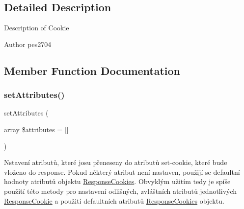 \subsection{Detailed Description}
Description of Cookie

\begin{DoxyAuthor}{Author}
pes2704 
\end{DoxyAuthor}


\subsection{Member Function Documentation}
\mbox{\label{class_pes_1_1_http_1_1_cookies_1_1_response_cookie_a9510d3a1a07572eeb03d9ccd1c4290c2}} 
\subsubsection{\texorpdfstring{set\+Attributes()}{setAttributes()}}
{\footnotesize\ttfamily set\+Attributes (\begin{DoxyParamCaption}\item[{array}]{\$attributes = {\ttfamily \mbox{[}\mbox{]}} }\end{DoxyParamCaption})}

Nstavení atributů, které josu přeneseny do atributů set-\/cookie, které bude vloženo do response. Pokud některý atribut není nastaven, použijí se defaultní hodnoty atributů objektu \mbox{\hyperlink{class_pes_1_1_http_1_1_cookies_1_1_response_cookies}{Response\+Cookies}}. Obvyklým užitím tedy je spíše použití této metody pro nastavení odlišných, zvláštních atributů jednotlivých \mbox{\hyperlink{class_pes_1_1_http_1_1_cookies_1_1_response_cookie}{Response\+Cookie}} a použití defaultních atributů \mbox{\hyperlink{class_pes_1_1_http_1_1_cookies_1_1_response_cookies}{Response\+Cookies}} objektu.

